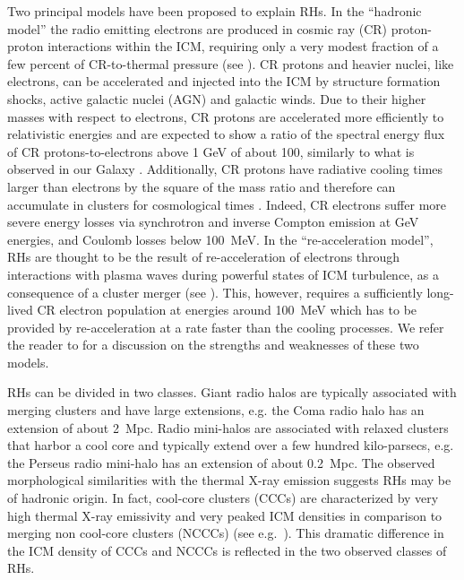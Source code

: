 \documentclass[traditabstract]{aa}
\begin{document}
Two principal models have been proposed to explain RHs.  In the ``hadronic
model'' the radio emitting electrons are produced in cosmic ray (CR)
proton-proton interactions within the ICM, requiring only a very modest fraction
of a few percent of CR-to-thermal pressure (see
\citealp{1980ApJ...239L..93D,1982AJ.....87.1266V, 1999APh....12..169B,
  2000A&A...362..151D, 2001ApJ...559...59M, 2001ApJ...562..233M,
  2003A&A...407L..73P, 2004A&A...413...17P, 2004MNRAS.352...76P,
  2007IJMPA..22..681B, 2008MNRAS.385.1211P, 2008MNRAS.385.1242P,
  2009JCAP...09..024K, 2010MNRAS.401...47D, 2010arXiv1003.0336D,
  2010arXiv1003.1133K, 2010arXiv1011.0729K, 2011A&A...527A..99E}).  CR protons
and heavier nuclei, like electrons, can be accelerated and injected into the ICM
by structure formation shocks, active galactic nuclei (AGN) and galactic winds.
Due to their higher masses with respect to electrons, CR protons are accelerated
more efficiently to relativistic energies and are expected to show a ratio of
the spectral energy flux of CR protons-to-electrons above 1 GeV of about 100,
similarly to what is observed in our Galaxy
\citep{2002cra..book.....S}. Additionally, CR protons have radiative cooling
times larger than electrons by the square of the mass ratio and therefore can
accumulate in clusters for cosmological times
\citep{1996SSRv...75..279V}. Indeed, CR electrons suffer more severe energy
losses via synchrotron and inverse Compton emission at GeV energies, and Coulomb
losses below 100~MeV.  In the ``re-acceleration model'', RHs are thought to be
the result of re-acceleration of electrons through interactions with plasma
waves during powerful states of ICM turbulence, as a consequence of a cluster
merger (see \citealp{1987A&A...182...21S, 1993ApJ...406..399G,
  2002A&A...386..456G, 2004MNRAS.350.1174B, 2005MNRAS.363.1173B,
  2007MNRAS.378..245B, 2010arXiv1008.0184B, 2009A&A...507..661B}). This,
however, requires a sufficiently long-lived CR electron population at energies
around 100~MeV which has to be provided by re-acceleration at a rate faster than
the cooling processes.  We refer the reader to \citet{2011A&A...527A..99E} for a
discussion on the strengths and weaknesses of these two models.

RHs can be divided in two classes. Giant radio halos are typically associated
with merging clusters and have large extensions, e.g. the Coma radio halo has an
extension of about 2~Mpc. Radio mini-halos are associated with relaxed clusters
that harbor a cool core and typically extend over a few hundred kilo-parsecs,
e.g. the Perseus radio mini-halo has an extension of about 0.2~Mpc.  The
observed morphological similarities with the thermal X-ray emission suggests RHs
may be of hadronic origin. In fact, cool-core clusters (CCCs) are characterized
by very high thermal X-ray emissivity and very peaked ICM densities in
comparison to merging non cool-core clusters (NCCCs) (see
e.g.~\citealp{2008A&A...487..431C}). This dramatic difference in the ICM density
of CCCs and NCCCs is reflected in the two observed classes of RHs.
\end{document}
